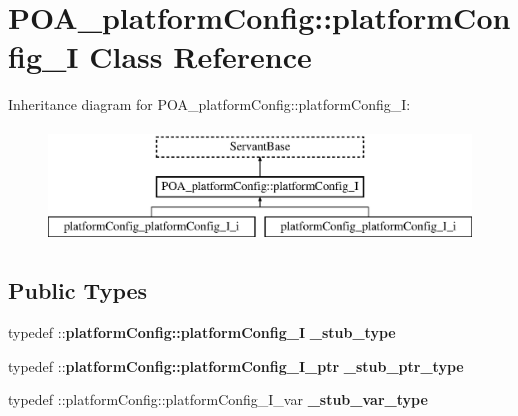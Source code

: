 \section{P\+O\+A\+\_\+platform\+Config\+:\+:platform\+Config\+\_\+I Class Reference}
\label{classPOA__platformConfig_1_1platformConfig__I}
Inheritance diagram for P\+O\+A\+\_\+platform\+Config\+:\+:platform\+Config\+\_\+I\+:\begin{figure}[H]
\begin{center}
\leavevmode
\includegraphics[height=3.000000cm]{classPOA__platformConfig_1_1platformConfig__I}
\end{center}
\end{figure}
\subsection*{Public Types}
\begin{DoxyCompactItemize}
\item 
typedef \+::{\bf platform\+Config\+::platform\+Config\+\_\+I} {\bfseries \+\_\+stub\+\_\+type}\label{classPOA__platformConfig_1_1platformConfig__I_a3c1e5721034bdea0f0ec78607dfb3227}

\item 
typedef \+::{\bf platform\+Config\+::platform\+Config\+\_\+\+I\+\_\+ptr} {\bfseries \+\_\+stub\+\_\+ptr\+\_\+type}\label{classPOA__platformConfig_1_1platformConfig__I_a57dd8325b07bb2bc638cef3aa40096cb}

\item 
typedef \+::platform\+Config\+::platform\+Config\+\_\+\+I\+\_\+var {\bfseries \+\_\+stub\+\_\+var\+\_\+type}\label{classPOA__platformConfig_1_1platformConfig__I_a6b61fb532f1c148944c93ad4ad71d568}

\end{DoxyCompactItemize}
